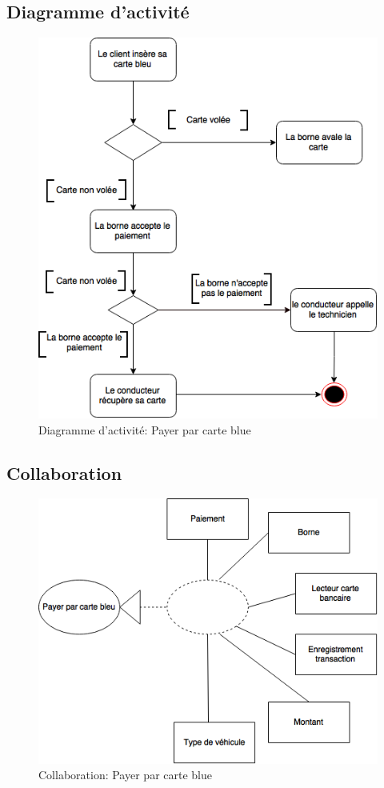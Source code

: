 \subsection{Diagramme d'activité}
\begin{figure}[h]
    \centering
    \includegraphics[scale=0.8]{02_Desenvolvimento/TD2/images/DAPayeBleu.png}
    \caption{Diagramme d'activité: Payer par carte blue}
\end{figure}
\newpage
\subsection{Collaboration}
\begin{figure}[h]
    \centering
    \includegraphics[scale=0.6]{02_Desenvolvimento/TD2/images/ColaCarteBleu.png}
    \caption{Collaboration: Payer par carte blue}
\end{figure}